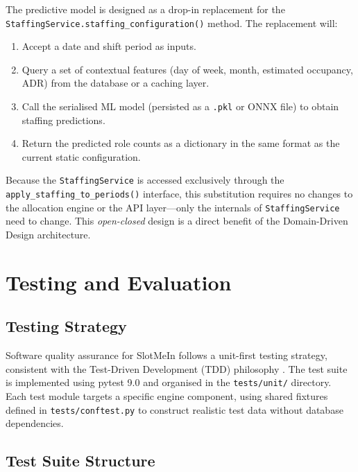 The predictive model is designed as a drop-in replacement for the \texttt{StaffingService.staffing\_configuration()} method. The replacement will:

\begin{enumerate}
    \item Accept a date and shift period as inputs.
    \item Query a set of contextual features (day of week, month, estimated occupancy, ADR) from the database or a caching layer.
    \item Call the serialised ML model (persisted as a \texttt{.pkl} or ONNX file) to obtain staffing predictions.
    \item Return the predicted role counts as a dictionary in the same format as the current static configuration.
\end{enumerate}

Because the \texttt{StaffingService} is accessed exclusively through the \texttt{apply\_staffing\_to\_periods()} interface, this substitution requires no changes to the allocation engine or the API layer—only the internals of \texttt{StaffingService} need to change. This \textit{open-closed} design \cite{martin_2003} is a direct benefit of the Domain-Driven Design architecture.

\chapter{Testing and Evaluation}

\section{Testing Strategy}

Software quality assurance for SlotMeIn follows a unit-first testing strategy, consistent with the Test-Driven Development (TDD) philosophy \cite{beck_2002}. The test suite is implemented using pytest 9.0 and organised in the \texttt{tests/unit/} directory. Each test module targets a specific engine component, using shared fixtures defined in \texttt{tests/conftest.py} to construct realistic test data without database dependencies.

\section{Test Suite Structure}

